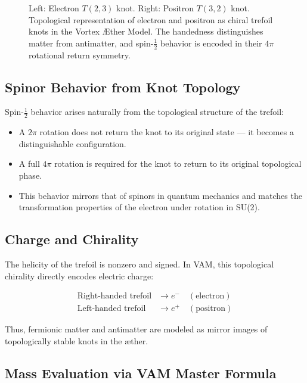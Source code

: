 \begin{figure}[H]
\begin{minipage}{0.45\textwidth}
\end{minipage}
\caption{Left: Electron \(T(2,3)\) knot. Right: Positron \(T(3,2)\) knot. Topological representation of electron and positron as chiral trefoil knots in the Vortex \AE{}ther Model. The handedness distinguishes matter from antimatter, and spin-\(\tfrac{1}{2}\) behavior is encoded in their \(4\pi\) rotational return symmetry. }
\label{fig:trefoil_knot_pair}
\end{figure}



\subsection{Spinor Behavior from Knot Topology}

Spin-\(\tfrac{1}{2}\) behavior arises naturally from the topological structure of the trefoil:

\begin{itemize}
    \item A \(2\pi\) rotation does not return the knot to its original state — it becomes a distinguishable configuration.
    \item A full \(4\pi\) rotation is required for the knot to return to its original topological phase.
    \item This behavior mirrors that of spinors in quantum mechanics and matches the transformation properties of the electron under rotation in SU(2).
\end{itemize}

\subsection{Charge and Chirality}

The helicity of the trefoil is nonzero and signed. In VAM, this topological chirality directly encodes electric charge:

\begin{align*}
\text{Right-handed trefoil} &\rightarrow e^- \quad (\text{electron}) \\
\text{Left-handed trefoil} &\rightarrow e^+ \quad (\text{positron})
\end{align*}

Thus, fermionic matter and antimatter are modeled as mirror images of topologically stable knots in the æther.

\subsection{Mass Evaluation via VAM Master Formula}

